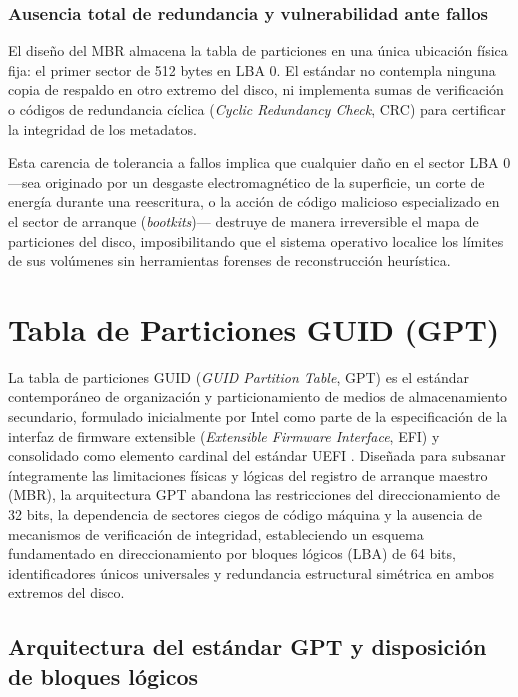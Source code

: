 \documentclass[12pt]{article}
\begin{document}
\subsubsection{Ausencia total de redundancia y vulnerabilidad ante fallos}

El diseño del MBR almacena la tabla de particiones en una única ubicación física fija: el primer sector de 512 bytes en LBA 0. El estándar no contempla ninguna copia de respaldo en otro extremo del disco, ni implementa sumas de verificación o códigos de redundancia cíclica (\textit{Cyclic Redundancy Check}, CRC) para certificar la integridad de los metadatos.

Esta carencia de tolerancia a fallos implica que cualquier daño en el sector LBA 0 —sea originado por un desgaste electromagnético de la superficie, un corte de energía durante una reescritura, o la acción de código malicioso especializado en el sector de arranque (\textit{bootkits})— destruye de manera irreversible el mapa de particiones del disco, imposibilitando que el sistema operativo localice los límites de sus volúmenes sin herramientas forenses de reconstrucción heurística.

\section{Tabla de Particiones GUID (GPT)}
\label{sec:tablaParticionesGpt}

La tabla de particiones GUID (\textit{GUID Partition Table}, GPT) es el estándar contemporáneo de organización y particionamiento de medios de almacenamiento secundario, formulado inicialmente por Intel como parte de la especificación de la interfaz de firmware extensible (\textit{Extensible Firmware Interface}, EFI) y consolidado como elemento cardinal del estándar UEFI \parencite[\S 5.1, p.\ 110]{uefi2024specification}. Diseñada para subsanar íntegramente las limitaciones físicas y lógicas del registro de arranque maestro (MBR), la arquitectura GPT abandona las restricciones del direccionamiento de 32 bits, la dependencia de sectores ciegos de código máquina y la ausencia de mecanismos de verificación de integridad, estableciendo un esquema fundamentado en direccionamiento por bloques lógicos (LBA) de 64 bits, identificadores únicos universales y redundancia estructural simétrica en ambos extremos del disco.

\subsection{Arquitectura del estándar GPT y disposición de bloques lógicos}
\label{subsec:arquitecturaGpt}
\end{document}
